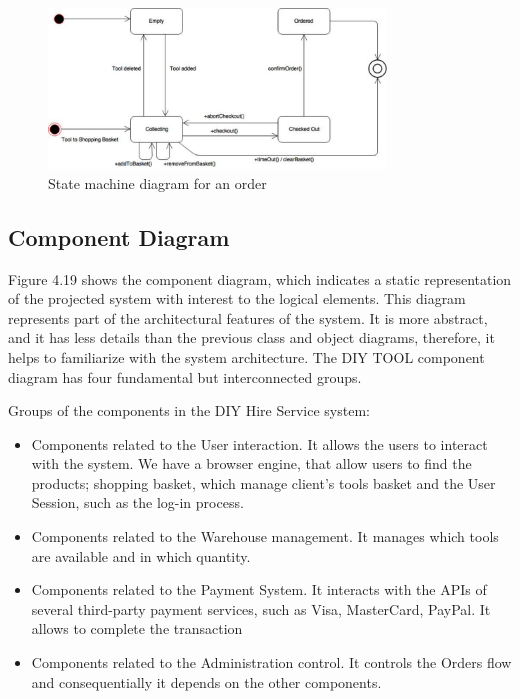 \documentclass[fontsize=11pt]{extarticle}
\numberwithin{figure}{section} %
\numberwithin{table}{section}%
\begin{document}
\begin{figure}[H]
      \centering
      \includegraphics[trim = 0 0 0 0, clip, width=0.8\textwidth]{TempImg/BasketSM.png}
      \caption{State machine diagram for an order}
\end{figure}

\hypertarget{component-diagram}{%
\subsection{Component Diagram}\label{component-diagram}}

Figure 4.19 shows the component diagram, which indicates a static
representation of the projected system with interest to the logical
elements. This diagram represents part of the architectural features of
the system. It is more abstract, and it has less details than the
previous class and object diagrams, therefore, it helps to familiarize
with the system architecture. The DIY TOOL component diagram has four
fundamental but interconnected groups.

Groups of the components in the DIY Hire Service system:

\begin{itemize}
  \item Components related to the User interaction. It allows the users to interact with the system. We have a browser engine, that allow users to find the products; shopping basket, which manage client’s tools basket and the User Session, such as the log-in process.
  \item Components related to the Warehouse management. It manages which tools are available and in which quantity.
  \item Components related to the Payment System. It interacts with the APIs of several third-party payment services, such as Visa, MasterCard, PayPal. It allows to complete the transaction
  \item Components related to the Administration control. It controls the Orders flow and consequentially it depends on the other components. 
\end{itemize}
\end{document}
